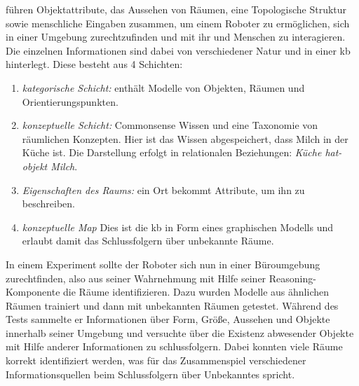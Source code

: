 \cite{pronobis1} führen Objektattribute, das Aussehen von Räumen, eine Topologische Struktur sowie menschliche Eingaben zusammen, um einem Roboter zu ermöglichen, sich in einer Umgebung zurechtzufinden und mit ihr und Menschen zu interagieren. Die einzelnen Informationen sind dabei von verschiedener Natur und in einer \gls{kb} hinterlegt. Diese besteht aus 4 Schichten: 
\begin{enumerate}
	\item \textit{kategorische Schicht:} enthält Modelle von Objekten, Räumen und Orientierungspunkten.
	\item \textit{konzeptuelle Schicht:} Commonsense Wissen und eine Taxonomie von räumlichen Konzepten. Hier ist das Wissen abgespeichert, dass Milch in der Küche ist. Die Darstellung erfolgt in relationalen Beziehungen: \textit{Küche hat-objekt Milch}.
	\item \textit{Eigenschaften des Raums:} ein Ort bekommt Attribute, um ihn zu beschreiben.
	\item \textit{konzeptuelle Map} Dies ist die \gls{kb} in Form eines graphischen Modells und erlaubt damit das Schlussfolgern über unbekannte Räume. 
\end{enumerate}
In einem Experiment sollte der Roboter sich nun in einer Büroumgebung zurechtfinden, also aus seiner Wahrnehmung mit Hilfe seiner Reasoning-Komponente die Räume identifizieren. Dazu wurden Modelle aus ähnlichen Räumen trainiert und dann mit unbekannten Räumen getestet. Während des Tests sammelte er Informationen über Form, Größe, Aussehen und Objekte innerhalb seiner Umgebung und versuchte über die Existenz abwesender Objekte mit Hilfe anderer Informationen zu schlussfolgern. Dabei konnten viele Räume korrekt identifiziert werden, was für das Zusammenspiel verschiedener Informationsquellen beim Schlussfolgern über Unbekanntes spricht.   
  \par


